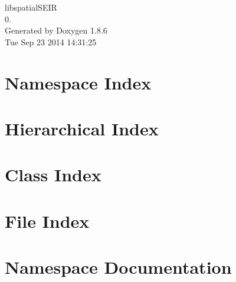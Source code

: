 \documentclass[twoside]{book}
\newcommand{\clearemptydoublepage}{%
  \newpage{\pagestyle{empty}\cleardoublepage}%
}
\begin{document}
\hypersetup{pageanchor=false}
\begin{titlepage}
\vspace*{7cm}
\begin{center}%
{\Large libspatial\-S\-E\-I\-R \\[1ex]\large 0. }\\
\vspace*{1cm}
{\large Generated by Doxygen 1.8.6}\\
\vspace*{0.5cm}
{\small Tue Sep 23 2014 14:31:25}\\
\end{center}
\end{titlepage}
\clearemptydoublepage
\tableofcontents
\clearemptydoublepage
{}
\hypersetup{pageanchor=true}

\chapter{Namespace Index}

\chapter{Hierarchical Index}

\chapter{Class Index}

\chapter{File Index}

\chapter{Namespace Documentation}

\end{document}
